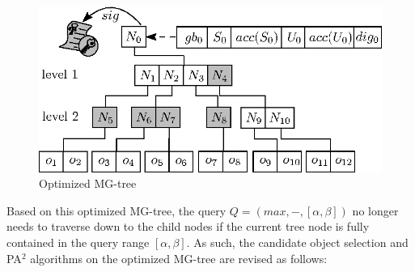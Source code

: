 \begin{figure}
  \centering
  \includegraphics[width=0.6\linewidth]{figs/aggregate-queries/grid_tree_opt.eps}
  \caption{Optimized MG-tree}\label{fig:aggregate-queries:mg-tree-opt}
\end{figure}

Based on this optimized MG-tree, the query $Q = (max, -, [\alpha, \beta])$ no longer needs to traverse down to the child nodes if the current tree node is fully contained in the query range $[\alpha, \beta]$. As such, the candidate object selection and PA$^2$ algorithms on the optimized MG-tree are revised as follows: %
